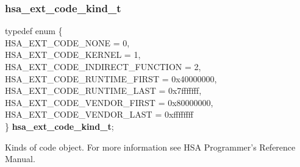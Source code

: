 \documentclass[final]{book}
\newcommand{\reftyp}[1]{#1}
\newcommand{\refenu}[1]{\reftyp{#1}}
\newenvironment{mylongtable}{\rowcolors{0}{lightgray}{lightgray}\longtable} {
\endlongtable}
\begin{document}
\subsubsection{hsa_\-ext_\-code_\-kind_\-t}
\vspace{-5.5mm}\begin{mylongtable}{@{}p{\textwidth}}
\rule{0pt}{3ex}typedef enum \{\\\hspace{1.7em}\hypertarget{group__ext-finalizer_1gga3a26aac857ef4f02699a2ed8a4c425e3aa692c691cdb10a56486a1e8d246414e3}{\refenu{HSA_\-EXT_\-CODE_\-NONE}} = 0,\\
\hspace{1.7em}\hypertarget{group__ext-finalizer_1gga3a26aac857ef4f02699a2ed8a4c425e3a5c83ef1db7eaa20cdf2612ba26e316cc}{\refenu{HSA_\-EXT_\-CODE_\-KERNEL}} = 1,\\
\hspace{1.7em}\hypertarget{group__ext-finalizer_1gga3a26aac857ef4f02699a2ed8a4c425e3a5f810d8ab0aae6b7f5af079857bbb14c}{\refenu{HSA_\-EXT_\-CODE_\-INDIRECT_\-FUNCTION}} = 2,\\
\hspace{1.7em}\hypertarget{group__ext-finalizer_1gga3a26aac857ef4f02699a2ed8a4c425e3afe329fae97936c684cd1e7df360c7160}{\refenu{HSA_\-EXT_\-CODE_\-RUNTIME_\-FIRST}} = 0x40000000,\\
\hspace{1.7em}\hypertarget{group__ext-finalizer_1gga3a26aac857ef4f02699a2ed8a4c425e3a9c49857996a8d326eabb3080b9e38972}{\refenu{HSA_\-EXT_\-CODE_\-RUNTIME_\-LAST}} = 0x7fffffff,\\
\hspace{1.7em}\hypertarget{group__ext-finalizer_1gga3a26aac857ef4f02699a2ed8a4c425e3aefd6d814296d049b06ab2de301cd10b1}{\refenu{HSA_\-EXT_\-CODE_\-VENDOR_\-FIRST}} = 0x80000000,\\
\hspace{1.7em}\hypertarget{group__ext-finalizer_1gga3a26aac857ef4f02699a2ed8a4c425e3accaced1295912da1748d70c5abde593b}{\refenu{HSA_\-EXT_\-CODE_\-VENDOR_\-LAST}} = 0xffffffff\\
\} \hypertarget{group__ext-finalizer_1ga3a26aac857ef4f02699a2ed8a4c425e3}{\textbf{hsa_\-ext_\-code_\-kind_\-t}};\rule[-2ex]{0pt}{0pt}\end{mylongtable}
\vspace{-2mm}Kinds of code object. For more information see HSA Programmer's Reference Manual.
\end{document}
